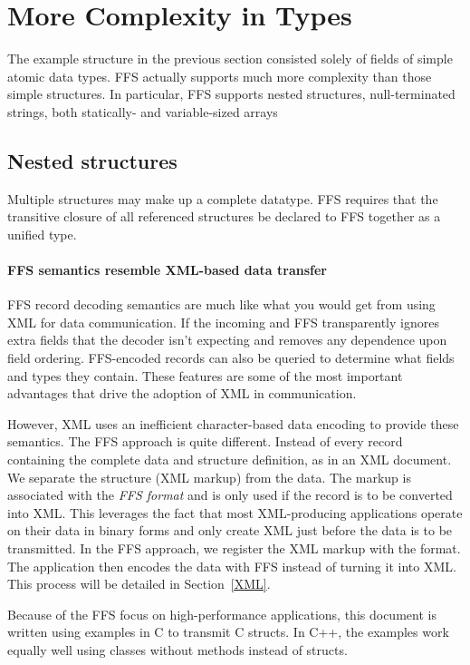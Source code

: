 \section{More Complexity in Types}
The example structure in the previous section consisted solely of fields of
simple atomic data types.  FFS actually supports much more complexity than
those simple structures.  In particular, FFS supports nested structures,
null-terminated strings, both statically- and variable-sized arrays
\subsection{Nested structures}
Multiple structures may make up a complete datatype.  FFS requires that the
transitive closure of all referenced structures be declared to FFS together
as a unified type.

\paragraph{FFS semantics resemble XML-based data transfer} FFS record
decoding semantics are much like what you would get from using XML for data
communication.  
If the incoming and
FFS transparently ignores extra fields that the decoder
isn't expecting and removes any dependence upon field ordering.  FFS-encoded
records can also be queried to determine what fields and types they contain.
These features are some of the most important advantages that drive the
adoption of XML in communication.

However, XML uses an inefficient character-based data encoding to provide
these semantics.  The FFS approach is quite different.  Instead of every
record containing the complete data and structure definition, as in an XML
document.  We separate the structure (XML markup) from the data.  The markup
is associated with the {\em FFS format} and is only used if the record is to
be converted into XML.  This leverages the fact that most XML-producing
applications operate on their data in binary forms and only create XML just
before the data is to be transmitted.  In the FFS approach, we register the
XML markup with the format.  The application then encodes the data with FFS
instead of turning it into XML.  This process will be detailed in
Section~\ref{XML}.

Because of the FFS focus on high-performance applications, this document
is written using examples in C to transmit C structs.  In C++, the examples
work equally well using classes without methods instead of structs.

